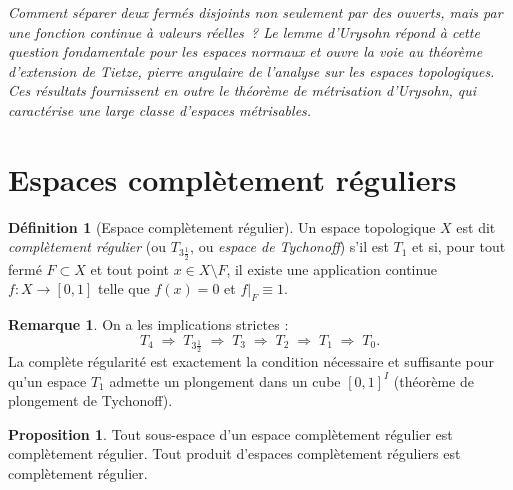 \documentclass[12pt,a4paper,openany]{book}
\theoremstyle{definition}
\newtheorem{definition}{Définition}[chapter]
\theoremstyle{cours}
\newtheorem{proposition}[theoreme]{Proposition}
\theoremstyle{coursnormal}
\newtheorem{remarque}[theoreme]{Remarque}
\begin{document}
\medskip
\noindent
\textit{Comment séparer deux fermés disjoints non seulement par des ouverts,
mais par une fonction continue à valeurs réelles~? Le lemme d'Urysohn
répond à cette question fondamentale pour les espaces normaux et ouvre
la voie au théorème d'extension de Tietze, pierre angulaire de l'analyse
sur les espaces topologiques. Ces résultats fournissent en outre le
théorème de métrisation d'Urysohn, qui caractérise une large classe
d'espaces métrisables.}

\section{Espaces complètement réguliers}
\label{sec:completement-regulier}

\begin{definition}[Espace complètement régulier]
\label{def:completement-regulier}
Un espace topologique $X$ est dit \emph{complètement régulier}
(ou \emph{$T_{3\frac{1}{2}}$}, ou \emph{espace de Tychonoff})
s'il est $T_1$ et si, pour tout fermé $F\subset X$ et tout point
$x\in X\setminus F$, il existe une application continue
$f\colon X\to [0,1]$ telle que $f(x)=0$ et $f|_F\equiv 1$.
\end{definition}

\begin{remarque}
\label{rem:hierarchie-separation-T3half}
On a les implications strictes :
\[
T_4 \;\Longrightarrow\; T_{3\tfrac{1}{2}} \;\Longrightarrow\; T_3
  \;\Longrightarrow\; T_2 \;\Longrightarrow\; T_1 \;\Longrightarrow\; T_0.
\]
La complète régularité est exactement la condition nécessaire et suffisante
pour qu'un espace $T_1$ admette un plongement dans un cube
$[0,1]^I$ (théorème de plongement de Tychonoff).
\end{remarque}

\begin{proposition}
\label{prop:sous-espace-completement-regulier}
Tout sous-espace d'un espace complètement régulier est complètement
régulier. Tout produit d'espaces complètement réguliers est complètement
régulier.
\end{proposition}
\end{document}
